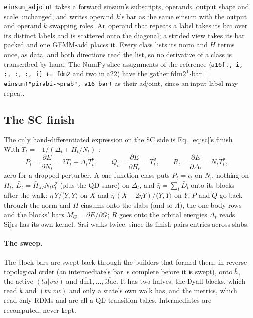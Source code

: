 \documentclass[11pt]{article}
\newcommand{\code}[1]{\texttt{#1}}
\newcommand{\Lb}{\Lambda}
\newcommand{\T}{\mathsf T}
\begin{document}
\code{einsum\_adjoint} takes a forward einsum's subscripts, operands, output
shape and scale unchanged, and writes operand $k$'s bar as the same einsum
with the output and operand $k$ swapping roles. An operand that repeats a
label takes its bar over its distinct labels and is scattered onto the
diagonal; a strided view takes its bar packed and one GEMM-add places it.
Every class lists its norm and $H$ terms once, as data, and both directions
read the list, so no derivative of a class is transcribed by hand. The
NumPy slice assignments of the reference (\code{a16[:, i, :, :, :, i] += fdm2}
and two in a22) have the gather $\mathrm{fdm2}^\T$-bar $=$
\code{einsum("pirabi->prab", a16\_bar)} as their adjoint, since an input label
may repeat.

\subsection{The SC finish}

The only hand-differentiated expression on the SC side is Eq.~\eqref{eq:sc}'s
finish. With $T_t = -1/(\Delta_t + H_t/N_t)$ \cite{park2019}:
\begin{equation}
  P_t = \frac{\partial E}{\partial N_t} = 2T_t + \Delta_t T_t^2,\qquad
  Q_t = \frac{\partial E}{\partial H_t} = T_t^2,\qquad
  R_t = \frac{\partial E}{\partial \Delta_t} = N_t T_t^2,
  \label{eq:pqr}
\end{equation}
zero for a dropped perturber. A one-function class puts $P_t = c_t$ on
$N_t$, nothing on $H_t$, $\bar D_t = \bar H_{JJ}N_tc_t^2$ (plus the QD share) on
$\Delta_t$, and $\bar\eta = \sum_t\bar D_t$ onto its blocks after the walk:
$\bar\eta\,Y/\langle Y,Y\rangle$ on $X$ and
$\bar\eta\,(X - 2\eta Y)/\langle Y,Y\rangle$ on $Y$. $P$ and $Q$ go back through the norm and $H$
einsums onto the slabs (and so $\Lb$), the one-body rows and the blocks'
bars $M_G = \partial E/\partial G$; $R$ goes onto the orbital energies
$\Delta_t$ reads. Sijrs has its own kernel. Srsi walks twice, since its
finish pairs entries across slabs.

\paragraph{The sweep.} The block bars are swept back through the builders
that formed them, in reverse topological order (an intermediate's bar is
complete before it is swept), onto $\bar h$, the active $\overline{(tu|vw)}$
and $\overline{\mathrm{dm1}}, \ldots, \overline{\mathrm{f3ac}}$. It has two
halves: the Dyall blocks, which read $h$ and $(tu|vw)$ and only a state's
own walk has, and the metrics, which read only RDMs and are all a QD
transition takes. Intermediates are recomputed, never kept.
\end{document}
